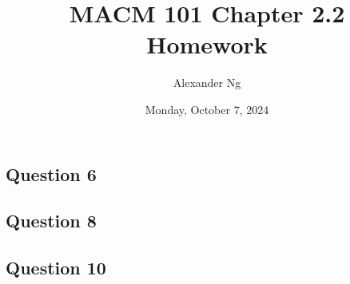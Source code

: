 \documentclass[12pt]{article}
\begin{document}
\title{MACM 101 Chapter 2.2 Homework}
\author{Alexander Ng}
\date{Monday, October 7, 2024}

\maketitle

\subsection*{Question 6}
\subsection*{Question 8}
\subsection*{Question 10}
\end{document}
